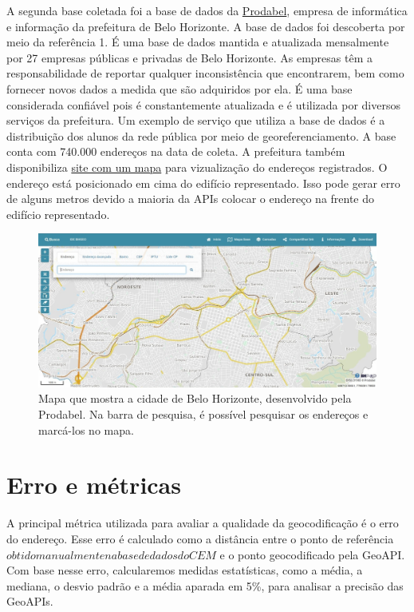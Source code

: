 A segunda base coletada foi a base de dados da \href{https://prefeitura.pbh.gov.br/prodabel}{Prodabel}, empresa de informática e informação da prefeitura de Belo Horizonte. A base de dados foi descoberta por meio da referência 1. É uma base de dados mantida e atualizada mensalmente por 27 empresas públicas e privadas de Belo Horizonte. As empresas têm a responsabilidade de reportar qualquer inconsistência que encontrarem, bem como fornecer novos dados a medida que são adquiridos por ela. É uma base considerada confiável pois é constantemente atualizada e é utilizada por diversos serviços da prefeitura. Um exemplo de serviço que utiliza a base de dados é a distribuição dos alunos da rede pública por meio de georeferenciamento. A base conta com 740.000 endereços na data de coleta. A prefeitura também disponibiliza \href{https://bhmap.pbh.gov.br}{site com um mapa} para vizualização do endereços registrados. O endereço está posicionado em cima do edifício representado. Isso pode gerar erro de alguns metros devido a maioria da APIs colocar o endereço na frente do edifício representado. 

\begin{figure}
    \centering
    \includegraphics[width=\textwidth]{Figuras/siteProdabel.jpeg}
    \caption{Mapa que mostra a cidade de Belo Horizonte, desenvolvido pela Prodabel. Na barra de pesquisa, é possível pesquisar os endereços e marcá-los no mapa.}
    \label{fig:siteProdabel}
\end{figure}


\section{Erro e métricas}

A principal métrica utilizada para avaliar a qualidade da geocodificação é o erro do endereço. Esse erro é calculado como a distância entre o ponto de referência \(obtido manualmente na base de dados do CEM\) e o ponto geocodificado pela GeoAPI. Com base nesse erro, calcularemos medidas estatísticas, como a média, a mediana, o desvio padrão e a média aparada em 5\%, para analisar a precisão das GeoAPIs.

